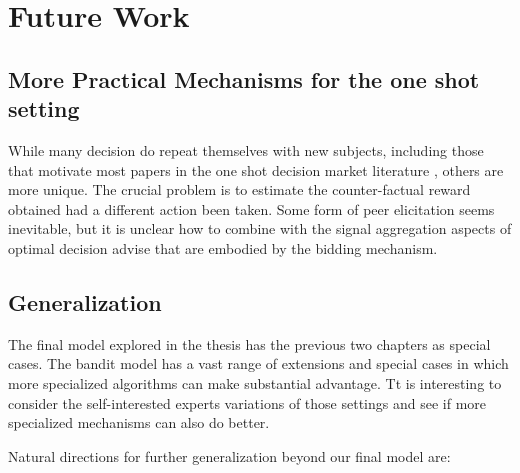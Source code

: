 
\section{Future Work} \label{sec:future}
\subsection{More Practical Mechanisms for the one shot setting}

While many decision do repeat themselves with new subjects, including those that motivate most papers in the one shot decision market literature , others are more unique. 
The crucial problem is to estimate the counter-factual reward obtained had a different action been taken.
Some form of peer elicitation seems inevitable, but it is unclear how to combine with the signal aggregation aspects of optimal decision advise that are embodied by the bidding mechanism. 


\subsection{Generalization}

The final model explored in the thesis has the previous two chapters as special cases.
The bandit model has a vast range of extensions and special cases in which more specialized algorithms can make substantial advantage. Tt is interesting to consider the self-interested experts variations of those settings and see if more specialized mechanisms can also do better.



Natural directions for further generalization beyond our final model are:


